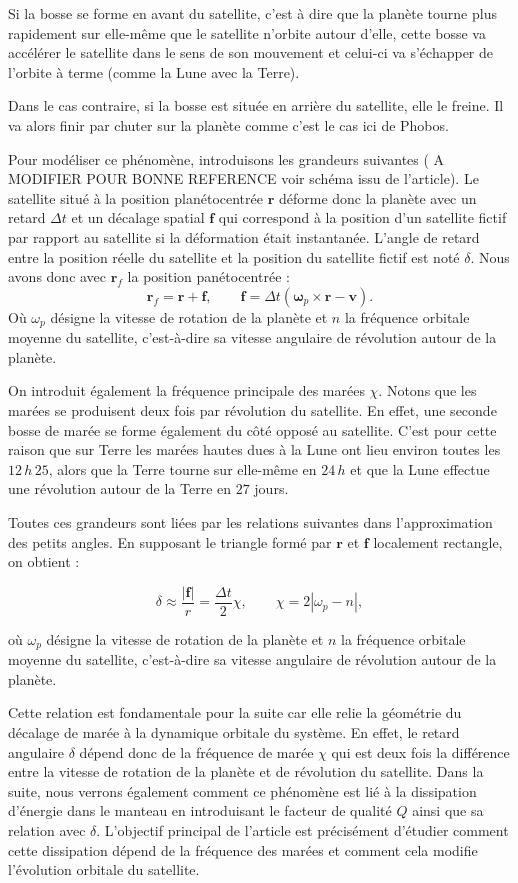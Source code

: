 \documentclass[12pt,a4paper]{article}
\begin{document}
    Si la bosse se forme en avant du satellite, c'est à dire que la planète tourne plus rapidement sur elle-même que le satellite n'orbite autour d'elle, cette bosse va accélérer le satellite dans le sens de son mouvement et celui-ci va s'échapper de l'orbite à terme (comme la Lune avec la Terre).

    Dans le cas contraire, si la bosse est située en arrière du satellite, elle le freine. Il va alors finir par chuter sur la planète comme c'est le cas ici de Phobos.

    Pour modéliser ce phénomène, introduisons les grandeurs suivantes ( A MODIFIER POUR BONNE REFERENCE voir schéma issu de l'article). Le satellite situé à la position planétocentrée $\mathbf r$ déforme donc la planète avec un retard $\Delta t$ et un décalage spatial $\mathbf f$ qui correspond à la position d'un satellite fictif par rapport au satellite si la déformation était instantanée. L'angle de retard entre la position réelle du satellite et la position du satellite fictif est noté $\delta$. Nous avons donc avec  $\mathbf r_f$ la position panétocentrée  : 
    \[
\mathbf r_f=\mathbf r+\mathbf f,
\qquad
\mathbf f=\Delta t(\boldsymbol{\omega}_p\times\mathbf r-\mathbf v).
\]
    Où $\omega_p$ désigne la vitesse de rotation de la planète et $n$ la fréquence orbitale moyenne du satellite, c’est-à-dire sa vitesse angulaire de révolution autour de la planète.

    On introduit également la fréquence principale des marées $\chi$. Notons que les marées se produisent deux fois par révolution du satellite. En effet, une seconde bosse de marée se forme également du côté opposé au satellite. C’est pour cette raison que sur Terre les marées hautes dues à la Lune ont lieu environ toutes les $12\,h\,25$, alors que la Terre tourne sur elle-même en $24\,h$ et que la Lune effectue une révolution autour de la Terre en  $27$ jours.

    Toutes ces grandeurs sont liées par les relations suivantes dans l’approximation des petits angles. En supposant le triangle formé par $\mathbf r$ et $\mathbf f$ localement rectangle, on obtient :

\[
\delta \approx \frac{|\mathbf f|}{r}
=
\frac{\Delta t}{2}\chi,
\qquad
\chi = 2|\omega_p-n|,
\]

où $\omega_p$ désigne la vitesse de rotation de la planète et $n$ la fréquence orbitale moyenne du satellite, c’est-à-dire sa vitesse angulaire de révolution autour de la planète.
     
    Cette relation est fondamentale pour la suite car elle relie la géométrie du décalage  de marée à la dynamique orbitale du système. En effet, le retard angulaire $\delta$ dépend donc de la fréquence de marée $\chi$ qui est deux fois la différence entre la vitesse de rotation de la planète et de révolution du satellite. Dans la suite, nous verrons également comment ce phénomène est lié à la dissipation d’énergie dans le manteau en introduisant le facteur de qualité $Q$ ainsi que sa relation avec  $\delta$. L’objectif principal de l’article est précisément d’étudier comment cette dissipation dépend de la fréquence des marées et comment cela modifie l’évolution orbitale du satellite.
\end{document}
